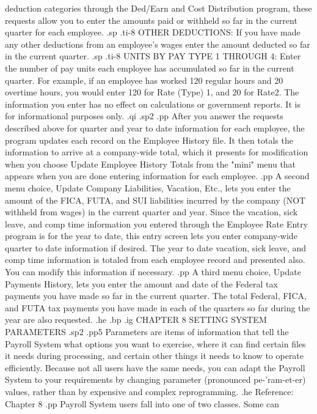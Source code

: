 deduction categories through the Ded/Earn and Cost Distribution
program, these
requests allow you to enter the amounts paid or withheld so far in the
current quarter for each employee.
.sp
.ti-8
OTHER DEDUCTIONS: If you have made any other deductions from an employee's
wages enter the amount deducted so far in the current quarter.
.sp
.ti-8
UNITS BY PAY TYPE 1 THROUGH 4: Enter the number of pay units each
employee has accumulated so far in the current quarter.  For example,
if an employee has worked 120 regular hours and 20 overtime hours, you
would enter 120 for Rate (Type) 1, and 20 for Rate2. The information you
enter has no effect on calculations or government reports.  It is
for informational purposes only.
.qi
.sp2
.pp
After you answer the requests described above for quarter and year
to date information for each employee, the program updates each record
on the Employee History file. It then totals the information
to arrive at a company-wide total, which it presents for modification when
you choose Update Employee History Totals from the "mini" menu that appears
when you are done entering information for each employee.
.pp
A second menu choice, Update Company Liabilities, Vacation, Etc., lets
you enter the amount of the FICA, FUTA, and SUI liabilities incurred
by the company (NOT withheld from wages)
in the current quarter and year.  Since the vacation,
sick leave, and comp time information you entered through the Employee
Rate Entry program is for the year to date, this entry screen lets you enter
company-wide quarter to date information if desired.  The year to date
vacation, sick leave, and comp time information is totaled from each
employee record and presented also.  You can modify this information
if necessary.
.pp
A third menu choice, Update Payments History, lets you enter the amount
and date of the Federal tax payments you have made so far in the
current quarter.  The total Federal, FICA, and FUTA tax payments you have
made in each of the quarters so far during the year are also requested.
.he
.bp
.ig
CHAPTER 8
SETTING SYSTEM PARAMETERS
.sp2
.pp5
Parameters are items of information that tell the Payroll System
what options you want to exercise, where it can find certain files it
needs during processing, and certain other things it needs to know to operate
efficiently.  Because not all users have the same needs, you can adapt
the Payroll System to your requirements by changing parameter (pronounced
pe-'ram-et-er) values,
rather than by expensive and complex reprogramming.
.he Reference: Chapter 8
.pp
Payroll System users fall into one of two classes.  Some can
